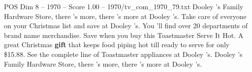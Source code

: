 \begin{textsample}{POS Dim 8 – 1970 – Score 1.00 – 1970/tv\_com\_1970\_79.txt}  \label{ex:f8_pos_086}
Dooley 's Family Hardware Store, there 's more, there 's more at Dooley 's.
Take care of everyone on your Christmas list and save at Dooley 's.
You 'll find over 20 departments of brand name merchandise.
Save when you buy this Toastmaster Serve It Hot.
A great Christmas \textbf{gift} that keeps food piping hot till ready to serve for only \$15.88.
See the complete line of Toastmaster appliances at Dooley 's.
Dooley 's Family Hardware Store, there 's more, there 's more at Dooley 's.

\end{textsample}
